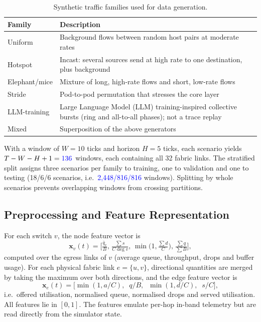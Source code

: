 \documentclass[conference]{IEEEtran}
\newcommand{\chk}[1]{\textcolor{blue}{#1}}
\begin{document}
\begin{table}[!t]
\centering
\caption{Synthetic traffic families used for data generation.}
\label{tab:families}
\footnotesize
\begin{tabular}{>{\raggedright\arraybackslash}p{1.7cm} >{\raggedright\arraybackslash}p{5.9cm}}
\toprule
\textbf{Family} & \textbf{Description}\\
\midrule
Uniform & Background flows between random host pairs at moderate rates\\
Hotspot & Incast: several sources send at high rate to one destination, plus background\\
Elephant/mice & Mixture of long, high-rate flows and short, low-rate flows\\
Stride & Pod-to-pod permutation that stresses the core layer\\
LLM-training & Large Language Model (LLM) training-inspired collective bursts (ring and all-to-all phases); not a trace replay\\
Mixed & Superposition of the above generators\\
\bottomrule
\end{tabular}
\end{table}

With a window of $W=10$ ticks and horizon $H=5$ ticks, each scenario yields $T-W-H+1=\chk{136}$ windows, each containing all 32 fabric links. The stratified split assigns three scenarios per family to training, one to validation and one to testing (18/6/6 scenarios, i.e.\ \chk{2,448/816/816} windows). Splitting by whole scenarios prevents overlapping windows from crossing partitions.

\subsection{Preprocessing and Feature Representation}
For each switch $v$, the node feature vector is
\begin{equation}
\mathbf{x}_v(t)=\Big[\tfrac{\bar{q}_v}{B},\, \tfrac{\sum s}{C\deg v},\, \min\!\big(1,\tfrac{\sum d}{C}\big),\, \tfrac{\sum q}{\sum B}\Big],
\label{eq:nodefeat}
\end{equation}
computed over the egress links of $v$ (average queue, throughput, drops and buffer usage). For each physical fabric link $e=\{u,v\}$, directional quantities are merged by taking the maximum over both directions, and the edge feature vector is
\begin{equation}
\mathbf{x}_e(t)=\big[\min(1,a/C),\;\; q/B,\;\; \min(1,d/C),\;\; s/C\big],
\label{eq:edgefeat}
\end{equation}
i.e.\ offered utilisation, normalised queue, normalised drops and served utilisation. All features lie in $[0,1]$. The features emulate per-hop in-band telemetry but are read directly from the simulator state.
\end{document}
